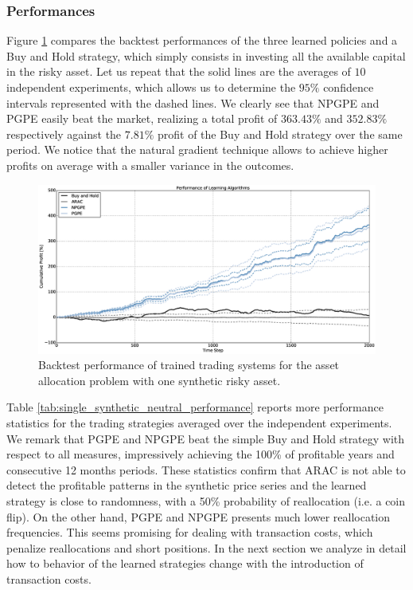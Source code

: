 \subsubsection{Performances}
Figure \ref{fig:single_synthetic_neutral_performance} compares the backtest performances of the three learned policies and a Buy and Hold strategy, which simply consists in investing all the available capital in the risky asset. Let us repeat that the solid lines are the averages of $10$ independent experiments, which allows us to determine the $95\%$ confidence intervals represented with the dashed lines. We clearly see that \gls{NPGPE} and \gls{PGPE} easily beat the market, realizing a total profit of $363.43\%$ and $352.83\%$ respectively against the $7.81\%$ profit of the Buy and Hold strategy over the same period. We notice that the natural gradient technique allows to achieve higher profits on average with a smaller variance in the outcomes.  
\begin{figure}[t]
	\centering
	\includegraphics[width=1.0\textwidth]{Images/6_1_single_synthetic_neutral_performance}
	\caption[Backtest performance with one synthetic risky asset.]{Backtest performance of trained trading systems for the asset allocation problem with one synthetic risky asset.}
	\label{fig:single_synthetic_neutral_performance}
\end{figure}
Table \ref{tab:single_synthetic_neutral_performance} reports more performance statistics for the trading strategies averaged over the independent experiments. We remark that \gls{PGPE} and \gls{NPGPE} beat the simple Buy and Hold strategy with respect to all measures, impressively achieving the 100\% of profitable years and consecutive 12 months periods. These statistics confirm that \gls{ARAC} is not able to detect the profitable patterns in the synthetic price series and the learned strategy is close to randomness, with a 50\% probability of reallocation (i.e. a coin flip). On the other hand, \gls{PGPE} and \gls{NPGPE} presents much lower reallocation frequencies. This seems promising for dealing with transaction costs, which penalize reallocations and short positions. In the next section we analyze in detail how to behavior of the learned strategies change with the introduction of transaction costs. 


